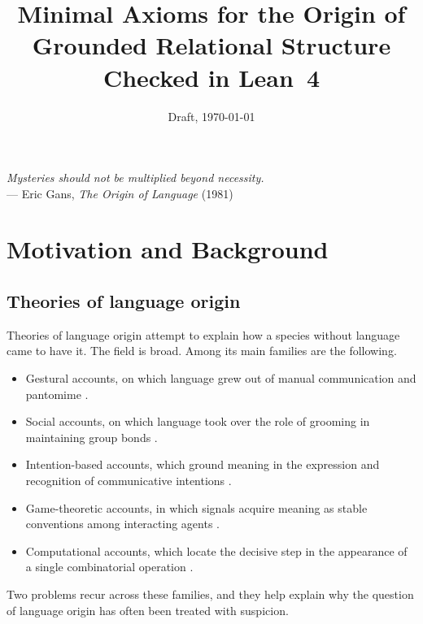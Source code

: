 \documentclass[11pt]{article}
\title{Minimal Axioms for the Origin of\\
Grounded Relational Structure\\[0.5em]
\large Checked in Lean~4}
\author{}
\date{Draft, \today}
\begin{document}
\maketitle

\begin{center}
\end{center}

\vspace{1em}
\begin{flushright}
\emph{Mysteries should not be multiplied beyond necessity.}\\[0.2em]
--- Eric Gans, \emph{The Origin of Language} (1981)
\end{flushright}


\section{Motivation and Background}

\subsection{Theories of language origin}

Theories of language origin attempt to explain how a species without language came to
have it. The field is broad. Among its main families are the following.
\begin{itemize}[nosep]
  \item Gestural accounts, on which language grew out of manual communication and
    pantomime \cite{Corballis2002,Arbib2012}.
  \item Social accounts, on which language took over the role of grooming in maintaining
    group bonds \cite{Dunbar1996}.
  \item Intention-based accounts, which ground meaning in the expression and recognition
    of communicative intentions \cite{Grice1957,Tomasello2008}.
  \item Game-theoretic accounts, in which signals acquire meaning as stable conventions
    among interacting agents \cite{Lewis1969,Skyrms2010}.
  \item Computational accounts, which locate the decisive step in the appearance of a
    single combinatorial operation \cite{BerwickChomsky2016}.
\end{itemize}
Two problems recur across these families, and they help explain why the question of
language origin has often been treated with suspicion.
\end{document}
